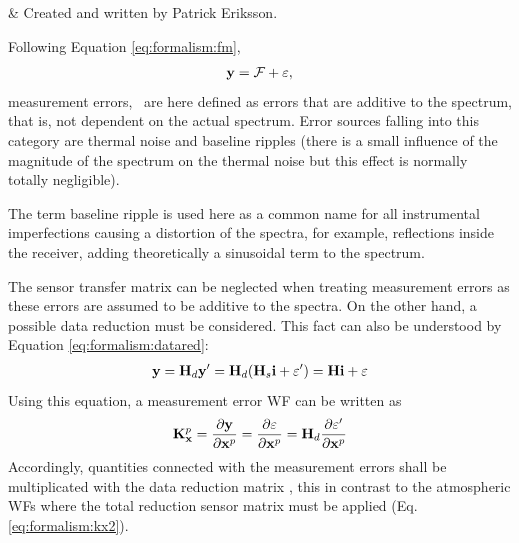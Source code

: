 %
%
 \label{sec:measerr}


%
%
 & Created and written by Patrick Eriksson.\\
\stophistory


%
%
%



%
%
Following Equation \ref{eq:formalism:fm},
\begin{eqnarray}
   \mathbf{y} = \mathcal{F} + \varepsilon, \nonumber
\end{eqnarray}
measurement errors, \merr\, are here defined as errors that are
additive to the spectrum, that is, not dependent on the actual spectrum.
Error sources falling into this category are thermal noise and
baseline ripples (there is a small influence of the magnitude of the
spectrum on the thermal noise but this effect is normally totally
negligible).

The term baseline ripple is used here as a common name for all instrumental
imperfections causing a distortion of the spectra, for example,
reflections inside the receiver, adding theoretically a sinusoidal term
to the spectrum.



 \label{sec:measerr:general}
 
 The sensor transfer matrix can be neglected when treating measurement
 errors as these errors are assumed to be additive to the spectra. On
 the other hand, a possible data reduction must be considered. This
 fact can also be understood by Equation \ref{eq:formalism:datared}:
 \begin{eqnarray}
   \mathbf{y} = \mathbf{H}_d \mathbf{y}' = \mathbf{H}_d (\mathbf{H}_s \mathbf{i} + \varepsilon') = \mathbf{H} \mathbf{i} + \varepsilon \nonumber
 \end{eqnarray}
 Using this equation, a measurement error WF can be
 written as
 \begin{equation}
    \mathbf{K}_{\mathbf{x}}^p = \frac{\partial \mathbf{y}}{\partial \mathbf{x}^p} 
               = \frac{\partial \varepsilon}{\partial \mathbf{x}^p}
               =  \mathbf{H}_d \frac{\partial \varepsilon'}{\partial \mathbf{x}^p}
  \label{eq:measerr:kx}
 \end{equation}
 Accordingly, quantities connected with the measurement errors shall be
 multiplicated with the data reduction matrix \Hd, this in contrast to
 the atmospheric WFs where the total reduction sensor matrix must be applied
 (Eq. \ref{eq:formalism:kx2}).



